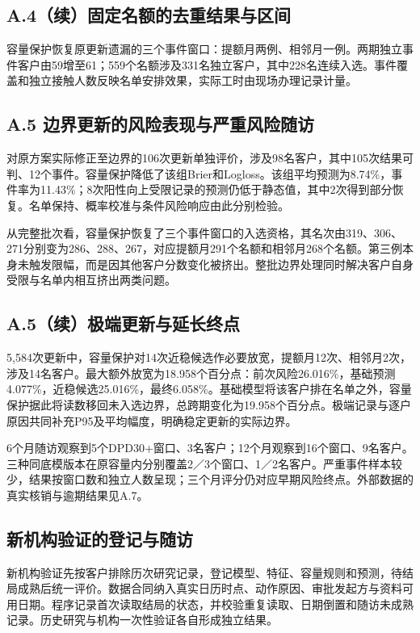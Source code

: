 \clearpage\subsection*{A.4（续）固定名额的去重结果与区间}


容量保护恢复原更新遗漏的三个事件窗口：提额月两例、相邻月一例。两期独立事件客户由59增至61；559个名额涉及331名独立客户，其中228名连续入选。事件覆盖和独立接触人数反映名单安排效果，实际工时由现场办理记录计量。

\clearpage\subsection*{A.5 边界更新的风险表现与严重风险随访}


对原方案实际修正至边界的106次更新单独评价，涉及98名客户，其中105次结果可判、12个事件。容量保护降低了该组Brier和Logloss。该组平均预测为8.74\%，事件率为11.43\%；8次阳性向上受限记录的预测仍低于静态值，其中2次得到部分恢复。名单保持、概率校准与条件风险响应由此分别检验。

从完整批次看，容量保护恢复了三个事件窗口的入选资格，其名次由319、306、271分别变为286、288、267，对应提额月291个名额和相邻月268个名额。第三例本身未触发限幅，而是因其他客户分数变化被挤出。整批边界处理同时解决客户自身受限与名单内相互挤出两类问题。

\clearpage\subsection*{A.5（续）极端更新与延长终点}
5,584次更新中，容量保护对14次近稳候选作必要放宽，提额月12次、相邻月2次，涉及14名客户。最大额外放宽为18.958个百分点：前次风险26.016\%，基础预测4.077\%，近稳候选25.016\%，最终6.058\%。基础模型将该客户排在名单之外，容量保护据此将读数移回未入选边界，总跨期变化为19.958个百分点。极端记录与逐户原因共同补充P95及平均幅度，明确稳定更新的实际边界。


6个月随访观察到5个DPD30+窗口、3名客户；12个月观察到16个窗口、9名客户。三种同底模版本在原容量内分别覆盖2／3个窗口、1／2名客户。严重事件样本较少，结果按窗口数和独立人数呈现；三个月评分仍对应早期风险终点。外部数据的真实核销与逾期结果见A.7。

\subsection*{新机构验证的登记与随访}
新机构验证先按客户排除历次研究记录，登记模型、特征、容量规则和预测，待结局成熟后统一评价。数据合同纳入真实日历时点、动作原因、审批发起方与资料可用日期。程序记录首次读取结局的状态，并校验重复读取、日期倒置和随访未成熟记录。历史研究与机构一次性验证各自形成独立结果。


